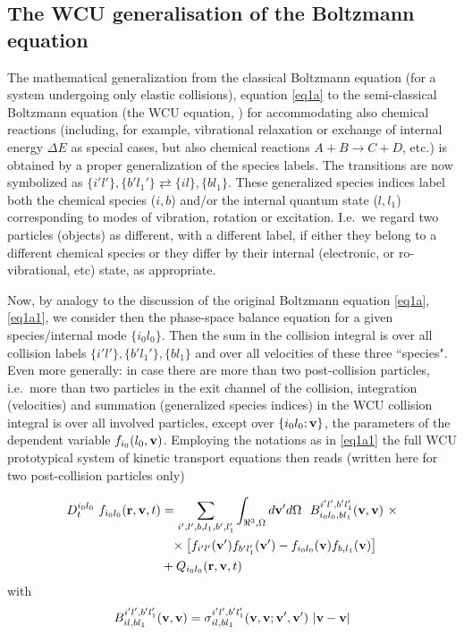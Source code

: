 \subsection{The \acs{WCU} generalisation of the Boltzmann equation}
\label{sec1.01} 

The mathematical generalization from the classical Boltzmann equation (for a
system undergoing only elastic collisions), equation \cref{eq1a} to the
semi-classical Boltzmann equation (the \ac{WCU} equation, \cite{kn:WCU}) for
accommodating also chemical reactions (including, for example, vibrational
relaxation or exchange of internal energy $\Delta E$ as special cases, but also
chemical reactions $A+B \rightarrow C+D$, etc.) is obtained by a proper
generalization of the species labels.
The transitions are now symbolized as $\{i'l'\},\{b'l_1'\} \rightleftarrows
  \{il\},\{bl_1\}$.
These generalized species indices label both the chemical species ($i,b$)
and/or the internal quantum state ($l,l_1$) corresponding to modes of
vibration, rotation or excitation.
I.e.\ we regard two particles (objects) as different, with a different label,
if either they belong to a different chemical species or they differ by their
internal (electronic, or ro-vibrational, etc) state, as appropriate.

Now, by analogy to the discussion of the original Boltzmann equation
\cref{eq1a}, \cref{eq1a1}, we consider then the phase-space balance equation
for a given species/internal mode $\{i_0l_0\}$.
Then the sum in the collision integral is over all collision labels $\{i'l'\},
  \{b'l_1'\}, \{bl_{1}\}$ and over all velocities of these three ``species".
Even more generally:
in case there are more than two post-collision particles, i.e.\ more than two
particles in the exit channel of the collision, integration (velocities) and
summation (generalized species indices) in the \ac{WCU} collision integral is
over all involved particles, except over $\{i_0l_0; \mathbf{v}\}
$, the parameters of the dependent variable $f_{i_0}(l_0,\mathbf{v})$.
Employing the notations as in \cref{eq1a1} the full \ac{WCU} prototypical
system of kinetic transport equations then reads (written here for two
post-collision particles only) 

\begin{align}
  \label{WCU} D_t^{i_0l_0} \ f_{i_0l_0}(\vr,\vvv,t) & =
  \sum_{i',l',b,l_1,b',l_1'}\int_{\Re^3,\Omega}  d\vvv'd\Omega \ \
  B_{i_0l_0,bl_1}^{i'l',b'l_1'}(\vvv,\vvv) \ \times                       \\
                                                   & \phantom{=} \times
  \left[f_{i'l'}
    (\vvv') f_{b'l_1'}(\vvv')- f_{i_0l_0}(\vvv) f_{b,l_1}(\vvv)\right] \nonumber
  \\
                                                   & + Q_{i_0l_0}
  (\vr,\vvv,t) \nonumber
\end{align}
with
\begin{equation}
  B_{il,bl_1}^{i'l',b'l_1'}(\vvv,\vvv) =
  \sigma_{il,bl_1}^{i'l',b'l_1'}(\vvv,\vvv;\vvv',\vvv') \ |\vvv-\vvv|
\end{equation}

